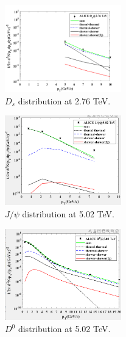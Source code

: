 \documentclass[twocolumn,aps,superscriptaddress,nofootinbib,floatfix]{revtex4}
\begin{document}
\begin{figure}[H]
	\includegraphics[width=0.45\textwidth]{v16_Ds_276.png}
	\caption{$D_s$ distribution at 2.76 TeV. }
	\label{fig83}
\end{figure}
 \begin{figure}[H]
	\includegraphics[width=0.45\textwidth]{v16_Jpsi_502.png}
	\caption{$J/\psi$ distribution at 5.02 TeV. }
	\label{fig84}
\end{figure}
\begin{figure}[H]
	\includegraphics[width=0.45\textwidth]{v16_D0_502.png}
	\caption{$D^0$ distribution at 5.02 TeV. }
	\label{fig85}
\end{figure}
\end{document}
